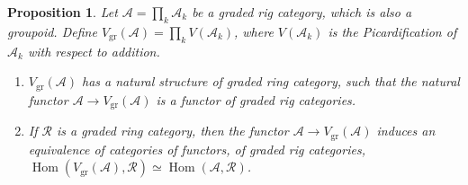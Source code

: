 \documentclass[11pt]{article}
\theoremstyle{plain}
\newtheorem{proposition}[theorem]{Proposition}
\theoremstyle{definition}
\newcommand{\Acal}{\mathcal A}
\newcommand{\Rcal}{\mathcal R}
\DeclareMathOperator{\Hom}{Hom}
\begin{document}
\begin{proposition}\label{prop:rig-to-ring-2}
Let $\Acal=\prod_{k}\Acal_{k}$ be a graded rig category, which is also a groupoid. Define $V_{\mathrm{gr}}(\Acal)=\prod_{k}V(\Acal_{k})$, where $V(\Acal_{k})$ is the Picardification of $\Acal_{k}$ with respect to addition.
\begin{enumerate}
\item $V_{\mathrm{gr}}(\Acal)$ has a natural structure of graded ring category, such that the natural functor $\Acal\to V_{\mathrm{gr}}(\Acal)$ is a functor of graded rig categories.
\item If $\Rcal$ is a graded ring category, then the functor $\Acal\to V_{\mathrm{gr}}(\Acal)$ induces an equivalence of categories of functors, of graded rig categories, $\Hom(V_{\mathrm{gr}}(\Acal),\Rcal)\simeq\Hom(\Acal,\Rcal)$.
\end{enumerate}
\end{proposition}
\end{document}

